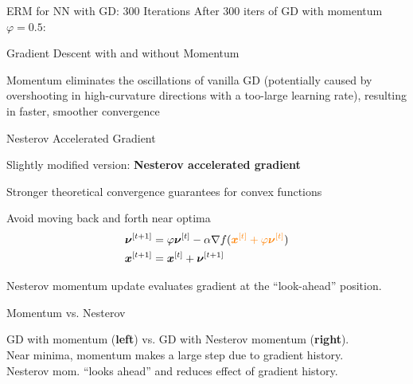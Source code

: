 \documentclass[11pt,compress,t,notes=noshow, xcolor=table]{beamer}
\begin{document}
\begin{framev}[align=top]{ERM for NN with GD: 300 Iterations}
After $300$ iters of GD with momentum $\varphi = 0.5$:
\end{framev}


\begin{framev}[align=center]{Gradient Descent with and without Momentum}
\begin{itemizeS}[footnotesize]
\item[] Momentum eliminates the oscillations of vanilla GD (potentially caused by overshooting in high-curvature directions with a too-large learning rate), resulting in faster, smoother convergence
\end{itemizeS}
\end{framev}


\begin{framei}{Nesterov Accelerated Gradient}
\item Slightly modified version: \textbf{Nesterov accelerated gradient}
\item Stronger theoretical convergence guarantees for convex functions
\item Avoid moving back and forth near optima
\begin{align*}
\bm{\nu}^{[t+1]} &= \varphi \bm{\nu}^{[t]} - \alpha \nabla f(\textcolor{orange}{\bm{x}^{[t]} + \varphi \bm{\nu}^{[t]}}) \\
\bm{x}^{[t+1]} &= \bm{x}^{[t]} + \bm{\nu}^{[t+1]}
\end{align*}
\vfill
\begin{itemizeS}[footnotesize]
\item[] Nesterov momentum update evaluates gradient at the ``look-ahead'' position.
\end{itemizeS}
\end{framei}


\begin{framev}{Momentum vs. Nesterov}
\vfill
\begin{itemizeS}[footnotesize]
\item[] GD with momentum (\textbf{left}) vs. GD with Nesterov momentum (\textbf{right}).\\
Near minima, momentum makes a large step due to gradient history.\\
Nesterov mom. ``looks ahead'' and reduces effect of gradient history.
\end{itemizeS}
\end{framev}

\endlecture
\end{document}
